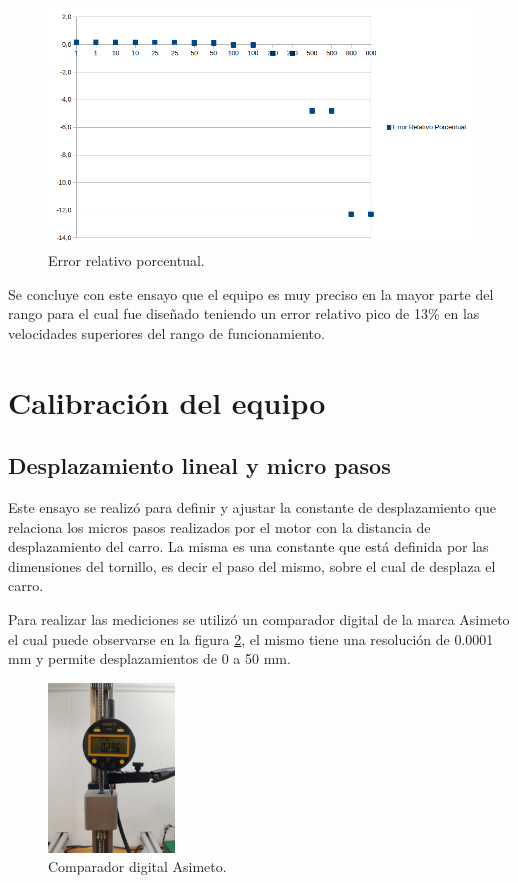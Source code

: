 \begin{figure}[h]
\centering 
\includegraphics[width=1\textwidth]{./Figures/error.png}
\caption{Error relativo porcentual.}
\label{fig:error_porcentual_1}
\end{figure}
Se concluye con este ensayo que el equipo es muy preciso en la mayor parte del rango para el cual fue diseñado teniendo un error relativo pico de 13\% en las velocidades superiores del rango de funcionamiento.
 
  
\section{Calibración del equipo}
\label{sec:calibración}
\subsection{Desplazamiento lineal y micro pasos}

Este ensayo se realizó para definir y ajustar la constante de desplazamiento que relaciona los micros pasos realizados por el motor con la distancia de desplazamiento del carro. La misma es una constante que está definida por las dimensiones del tornillo, es decir el paso del mismo,  sobre el cual de desplaza el carro.

Para realizar las mediciones se utilizó un comparador digital de la marca Asimeto\citep{web_asimeto} el cual puede observarse en la figura \ref{fig:micrometro}, el mismo tiene una resolución de 0.0001 mm y permite desplazamientos de 0 a 50 mm.


\begin{figure}[h]
\centering 
\includegraphics[width=0.3\textwidth]{./Figures/micrometro.png}
\caption{Comparador digital Asimeto.}
\label{fig:micrometro}
\end{figure}


